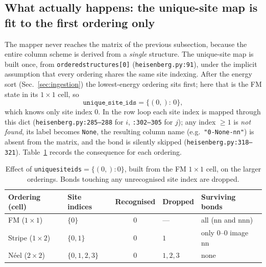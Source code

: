 \documentclass[11pt]{article}
\newcommand{\code}[1]{\texttt{\def\_{\textunderscore\allowbreak}#1}}
\begin{document}
\subsection{What actually happens: the unique-site map is fit to the first
ordering only}
The mapper never reaches the matrix of the previous subsection, because the
entire column scheme is derived from a \emph{single} structure. The unique-site
map is built once, from \code{ordered\_structures[0]} (\code{heisenberg.py:91}),
under the implicit assumption that every ordering shares the same site indexing.
After the energy sort (Sec.~\ref{sec:ingestion}) the lowest-energy ordering sits
first; here that is the FM state in its $1\times1$ cell, so
\begin{equation*}
  \texttt{unique\_site\_ids} = \{(0,)\!:\,0\},
\end{equation*}
which knows only site index $0$. In the row loop each site index is mapped
through this dict (\code{heisenberg.py:285--288} for $i$, \code{:302--305} for
$j$); any index $\ge 1$ is \emph{not found}, its label becomes \code{None}, the
resulting column name (e.g.\ \code{"0-None-nn"}) is absent from the matrix, and
the bond is silently skipped (\code{heisenberg.py:318--321}).
Table~\ref{tab:dropped} records the consequence for each ordering.

\begin{table}[h]
\centering
\caption{Effect of \code{unique\_site\_ids}$=\{(0,)\!:0\}$, built from the FM
$1\times1$ cell, on the larger orderings. Bonds touching any unrecognised site
index are dropped.}
\label{tab:dropped}
\begin{tabularx}{\textwidth}{@{}l l c l X@{}}
\toprule
Ordering (cell) & Site indices & Recognised & Dropped & Surviving bonds \\
\midrule
FM ($1\times1$)     & $\{0\}$       & $0$ & ---       & all (nn and nnn) \\
Stripe ($1\times2$) & $\{0,1\}$     & $0$ & $1$       & only $0$--$0$ image nn \\
N\'eel ($2\times2$) & $\{0,1,2,3\}$ & $0$ & $1,2,3$   & none \\
\bottomrule
\end{tabularx}
\end{table}
\end{document}
